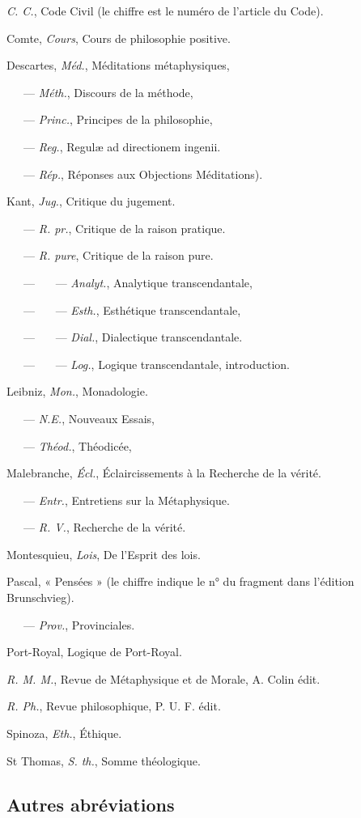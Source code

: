{\it C. C.}, Code Civil (le chiffre est le numéro de l’article du Code).

Comte, {\it Cours}, Cours de philosophie positive.

Descartes, {\it Méd.}, Méditations métaphysiques,

\ \ \ — {\it Méth.}, Discours de la méthode,

\ \ \ — {\it Princ.}, Principes de la philosophie,

\ \ \ — {\it Reg.}, Regulæ ad directionem ingenii.

\ \ \ — {\it Rép.}, Réponses aux Objections Méditations).

Kant, {\it Jug.}, Critique du jugement.

\ \ \ —  {\it R. pr.}, Critique de la raison pratique.

\ \ \ — {\it R. pure}, Critique de la raison pure.

\ \ \ — \ \ \ — {\it Analyt.}, Analytique transcendantale,

\ \ \ — \ \ \ — {\it Esth.}, Esthétique transcendantale,

\ \ \ — \ \ \ — {\it Dial.}, Dialectique transcendantale.

\ \ \ — \ \ \ — {\it Log.}, Logique transcendantale, introduction.

Leibniz, {\it Mon.}, Monadologie.

\ \ \ —  {\it N.E.}, Nouveaux Essais,

\ \ \ — {\it Théod.}, Théodicée,

Malebranche, {\it Écl.}, Éclaircissements à la Recherche de la vérité.

\ \ \ — {\it Entr.}, Entretiens sur la Métaphysique.

\ \ \ — {\it R. V.}, Recherche de la vérité.

Montesquieu, {\it Lois}, De l'Esprit des lois.

Pascal, « Pensées » (le chiffre indique le n° du fragment dans l'édition Brunschvieg).

\ \ \ —  {\it Prov.}, Provinciales.

Port-Royal, Logique de Port-Royal.

{\it R. M. M.}, Revue de Métaphysique et de Morale, A. Colin édit.

{\it R. Ph.}, Revue philosophique, P. U. F. édit.

Spinoza, {\it Eth.}, Éthique.

St Thomas, {\it S. th.}, Somme théologique.

\subsection {Autres abréviations}

